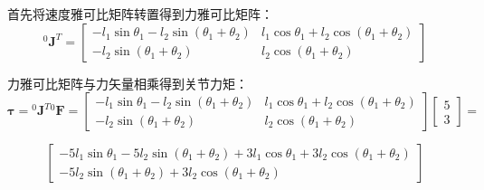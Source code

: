 \documentclass{homework}
\begin{document}
\begin{sol}

首先将速度雅可比矩阵转置得到力雅可比矩阵：
\[
  {^0}\mathbf{J}^T =
  \begin{bmatrix}
    - l_1 \sin\theta_1 - l_2 \sin(\theta_1 + \theta_2) & l_1 \cos\theta_1 + l_2 \cos(\theta_1 + \theta_2) \\
    - l_2 \sin(\theta_1 + \theta_2) & l_2 \cos(\theta_1 + \theta_2) 
  \end{bmatrix}
\]

力雅可比矩阵与力矢量相乘得到关节力矩：
\[
  \boldsymbol{\tau} =
  {^0}\mathbf{J}^T {^0}\mathbf{F} =
  \begin{bmatrix}
    - l_1 \sin\theta_1 - l_2 \sin(\theta_1 + \theta_2) & l_1 \cos\theta_1 + l_2 \cos(\theta_1 + \theta_2) \\
    - l_2 \sin(\theta_1 + \theta_2) & l_2 \cos(\theta_1 + \theta_2) 
  \end{bmatrix}
  \begin{bmatrix}
    5 \\
    3
  \end{bmatrix} =
\]

\[
  \begin{bmatrix}
    -5 l_1 \sin\theta_1 - 5 l_2 \sin(\theta_1 + \theta_2) + 3 l_1 \cos\theta_1 + 3 l_2 \cos(\theta_1 + \theta_2) \\
    -5 l_2 \sin(\theta_1 + \theta_2) + 3 l_2 \cos(\theta_1 + \theta_2)
  \end{bmatrix}
\]

\end{sol}

\question 
\end{document}

